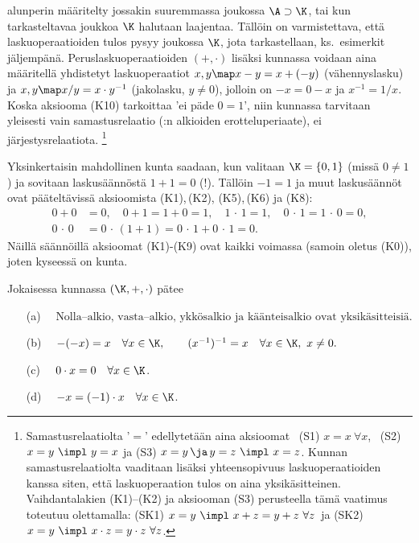 alunperin määritelty jossakin suuremmassa joukossa $\A\supset\K$, tai kun tarkasteltavaa joukkoa
$\K$ halutaan laajentaa. Tällöin on varmistettava, että laskuoperaatioiden tulos pysyy joukossa
$\K$, jota tarkastellaan, ks.\ esimerkit jäljempänä.
Peruslaskuoperaatioiden $(+,\cdot)$ lisäksi kunnassa voidaan aina määritellä
yhdistetyt laskuoperaatiot $x,y \map x-y = x+(-y)$ (vähennyslasku) ja
$x,y \map x/y = x \cdot y^{-1}$ (jakolasku, $y \neq 0$), jolloin on $-x=0-x$ ja $x^{-1}=1/x$.
Koska aksiooma (K10) tarkoittaa 'ei päde $0=1$', niin kunnassa tarvitaan yleisesti vain
samastusrelaatio (\K:n alkioiden erotteluperiaate), ei
järjestysrelaatiota.
%
\footnote[2]{Samastusrelaatiolta '$=$' edellytetään aina aksioomat \
(S1) $x=x\ \forall x$, \ (S2) $x=y \ \impl\ y=x$ ja (S3) $x=y \,\ja\, y=z \ \impl\ x=z$. Kunnan
samastusrelaatiolta vaaditaan lisäksi yhteensopivuus laskuoperaatioiden kanssa siten, että
laskuoperaation tulos on aina yksikäsitteinen. Vaihdantalakien (K1)--(K2) ja aksiooman (S3)
perusteella tämä vaatimus toteutuu olettamalla:\newline
(SK1) $x=y \ \impl\ x+z=y+z\ \forall z\,$ ja
(SK2) $x=y \ \impl\ x \cdot z = y \cdot z\ \forall z$.}
\begin{Exa} \label{yksinkertaisin kunta}
Yksinkertaisin mahdollinen kunta saadaan, kun valitaan $\K = \{0,1\}$ (missä $0\neq 1$) ja 
sovitaan laskusäännöstä $1+1 = 0$ (!). Tällöin $-1 = 1$ ja muut laskusäännöt ovat pääteltävissä
aksioomista (K1),\,(K2), (K5),\,(K6) ja (K8):
\begin{align*}
0+0 &= 0, \quad 0+1 = 1+0 = 1, \quad 1\,\cdot\,1 = 1, \quad 0\,\cdot\,1 = 1\,\cdot\,0 = 0, \\
0\,\cdot\,0 &= 0\,\cdot\,(1+1) = 0\,\cdot\,1 + 0\,\cdot\,1 = 0.
\end{align*}
Näillä säännöillä aksioomat (K1)-(K9) ovat kaikki voimassa (samoin oletus (K0)), joten kyseessä
on kunta. 
\loppu
\end{Exa}
\begin{Lause} \label{kuntatuloksia} Jokaisessa kunnassa $(\K,+,\cdot)$ pätee
\begin{itemize}
\item[(a)] $\quad \text{Nolla--alkio, vasta--alkio, ykkösalkio ja käänteisalkio ovat
yksikäsitteisiä.}$
\item[(b)] $\quad -(-x) = x \quad \forall x \in \K, \quad\quad 
                  (x^{-1})^{-1} = x \quad \forall x \in \K,\ x \neq 0.$
\item[(c)] $\quad 0 \cdot x = 0 \quad \forall x \in \K$.
\item[(d)] $\quad -x = (-1) \cdot x \quad \forall x \in \K$.
\end{itemize}
\end{Lause}

